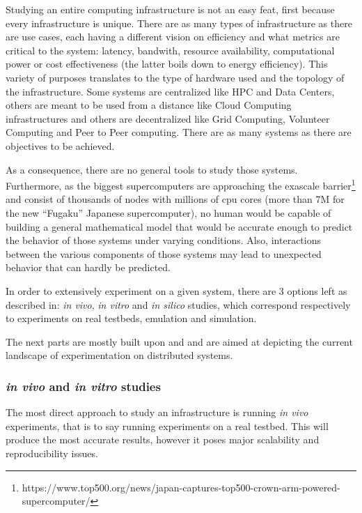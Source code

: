 \documentclass[12pt, a4paper]{memoir}
\begin{document}
Studying an entire computing infrastructure is not an easy feat, first because
every infrastructure is unique. There are as many types of infrastructure as
there are use cases, each having a different vision on efficiency and what
metrics are critical to the system: latency, bandwith, resource availability,
computational power or cost effectiveness (the latter boils down to energy
efficiency). This variety of purposes translates to the type of hardware used
and the topology of the infrastructure. Some systems are centralized like HPC
and Data Centers, others are meant to be used from a distance like Cloud
Computing infrastructures and others are decentralized like Grid Computing,
Volunteer Computing and Peer to Peer computing. There are as many systems as
there are objectives to be achieved.

As a consequence, there are no general tools to study those systems.
Furthermore, as the biggest supercomputers are approaching the exascale
barrier\footnote{https://www.top500.org/news/japan-captures-top500-crown-arm-powered-supercomputer/}
and consist of thousands of nodes with millions of cpu cores (more than 7M for
the new ``Fugaku'' Japanese supercomputer), no human would be capable of
building a general mathematical model that would be accurate enough to predict
the behavior of those systems under varying conditions. Also, interactions
between the various components of those systems may lead to unexpected
behavior\cite{10.1007/978-3-319-09873-9_12} that can hardly be predicted.

In order to extensively experiment on a given system, there are 3 options left
as described in\cite{legrand2015scheduling}: \textit{in vivo}, \textit{in
vitro} and \textit{in silico} studies, which correspond respectively to
experiments on real testbeds, emulation and simulation.  

The next parts are mostly built upon \cite{legrand2015scheduling} and
\cite{casanova:hal-01017319} and are aimed at depicting the current landscape
of experimentation on distributed systems.

\subsubsection{\textit{in vivo} and \textit{in vitro} studies}

The most direct approach to study an infrastructure is running \textit{in vivo}
experiments, that is to say running experiments on a real testbed. This will
produce the most accurate results, however it poses major scalability and
reproducibility issues.
\end{document}
